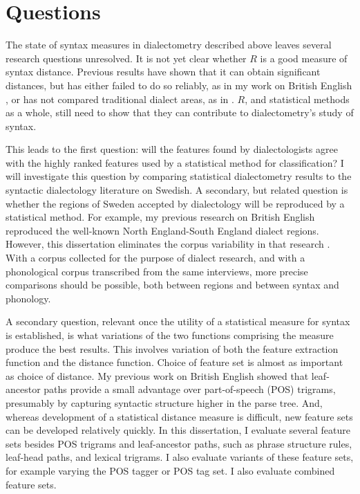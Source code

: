 \chapter{Questions}
\label{questions-chapter}

The state of syntax measures in dialectometry described above leaves
several research questions unresolved. It is not yet clear whether $R$
is a good measure of syntax distance. Previous results have shown that
it can obtain significant distances, but has either failed to do so
reliably, as in my work on British English \cite{sanders08b}, or has
not compared traditional dialect areas, as in
. $R$, and statistical methods as a whole, still
need to show that they can contribute to dialectometry's study of
syntax.

This leads to the first question: will the features found by
dialectologists agree with the highly ranked features used by a
statistical method for classification? I will investigate this
question by comparing statistical dialectometry results to the
syntactic dialectology literature on Swedish. A secondary, but related
question is whether the regions of Sweden accepted by dialectology
will be reproduced by a statistical method. For example, my previous
research on British English reproduced the well-known North
England-South England dialect regions. However, this dissertation
eliminates the corpus variability in that research
\cite{sanders08b}. With a corpus collected for the purpose of dialect
research, and with a phonological corpus transcribed from the same
interviews, more precise comparisons should be possible, both between
regions and between syntax and phonology.

A secondary question, relevant once the utility of a statistical
measure for syntax is established, is what variations of the two
functions comprising the measure produce the best results. This
involves variation of both the feature extraction function and the
distance function. Choice of feature set is almost as important as
choice of distance. My previous work on British English showed
that leaf-ancestor paths provide a small advantage over part-of-speech
(POS) trigrams, presumably by capturing syntactic structure higher in
the parse tree. And, whereas development of a statistical distance
measure is difficult, new feature sets can be developed relatively
quickly.
In this dissertation, I evaluate several feature sets besides POS trigrams and
leaf-ancestor paths, such as phrase structure rules, leaf-head paths,
and lexical trigrams. I also evaluate variants of these feature sets,
for example varying the POS tagger or POS tag set. I also evaluate
combined feature sets.

